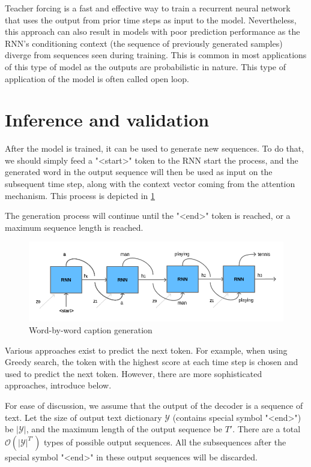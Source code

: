 Teacher forcing is a fast and effective way to train a recurrent neural network that uses the output from prior time steps as input to the model. Nevertheless, this approach can also result in models with poor prediction performance as the RNN’s conditioning context (the sequence of previously generated samples) diverge from sequences seen during training\citep{Lamb2016}. This is common in most applications of this type of model as the outputs are probabilistic in nature. This type of application of the model is often called open loop.

\section{Inference and validation}\label{sec:inference}

After the model is trained, it can be used to generate new sequences. To do that, we should simply feed a "<start>" token to the RNN start the process, and the generated word in the output sequence will then be used as input on the subsequent time step, along with the context vector coming from the attention mechanism. This process is depicted in \cref{fig:inference}

The generation process will continue until the "<end>" token is reached, or a maximum sequence length is reached. 

\begin{figure}[hpt]
    \centering
    \includegraphics[scale=0.5]{images/ch4/inference.png}
    \caption{Word-by-word caption generation}
    \label{fig:inference}
\end{figure}


Various approaches exist to predict the next token. For example, when using Greedy search, the token with the highest score at each time step is chosen and used to predict the next token. However, there are more sophisticated approaches, introduce below. 

For ease of discussion, we assume that the output of the decoder is a sequence of text. Let the size of output text dictionary $\mathcal{Y}$ (contains special symbol "<end>") be $\left|\mathcal{Y}\right|$, and the maximum length of the output sequence be $T'$. There are a total $\mathcal{O}(\left|\mathcal{Y}\right|^{T'})$ types of possible output sequences. All the subsequences after the special symbol "<end>" in these output sequences will be discarded.

